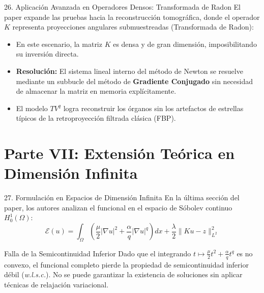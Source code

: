\documentclass[aspectratio=169,11pt]{beamer}
\begin{document}
\begin{frame}{26. Aplicación Avanzada en Operadores Densos: Transformada de Radon}
    El paper expande las pruebas hacia la reconstrucción tomográfica, donde el operador $K$ representa proyecciones angulares submuestreadas (Transformada de Radon):
    \begin{itemize}
        \item En este escenario, la matriz $K$ es densa y de gran dimensión, imposibilitando su inversión directa.
        \item \textbf{Resolución:} El sistema lineal interno del método de Newton se resuelve mediante un subbucle del método de \textbf{Gradiente Conjugado} sin necesidad de almacenar la matriz en memoria explícitamente.
        \item El modelo $TV^q$ logra reconstruir los órganos sin los artefactos de estrellas típicos de la retroproyección filtrada clásica (FBP).
    \end{itemize}
\end{frame}

\section{Parte VII: Extensión Teórica en Dimensión Infinita}

\begin{frame}{27. Formulación en Espacios de Dimensión Infinita}
    En la última sección del paper, los autores analizan el funcional en el espacio de Sóbolev continuo $H^1_0(\Omega)$:
    \begin{equation}
        \mathcal{E}(u) = \int_\Omega \left( \frac{\mu}{2}|\nabla u|^2 + \frac{\alpha}{q}|\nabla u|^q \right) dx + \frac{\lambda}{2}\|Ku - z\|_{L^2}^2
    \end{equation}
    \begin{alertblock}{Falla de la Semicontinuidad Inferior}
        Dado que el integrando $t \mapsto \frac{\mu}{2}t^2 + \frac{\alpha}{q}t^q$ es \alert{no convexo}, el funcional completo pierde la propiedad de semicontinuidad inferior débil (\textit{w.l.s.c.}). No se puede garantizar la existencia de soluciones sin aplicar técnicas de relajación variacional.
    \end{alertblock}
\end{frame}
\end{document}
